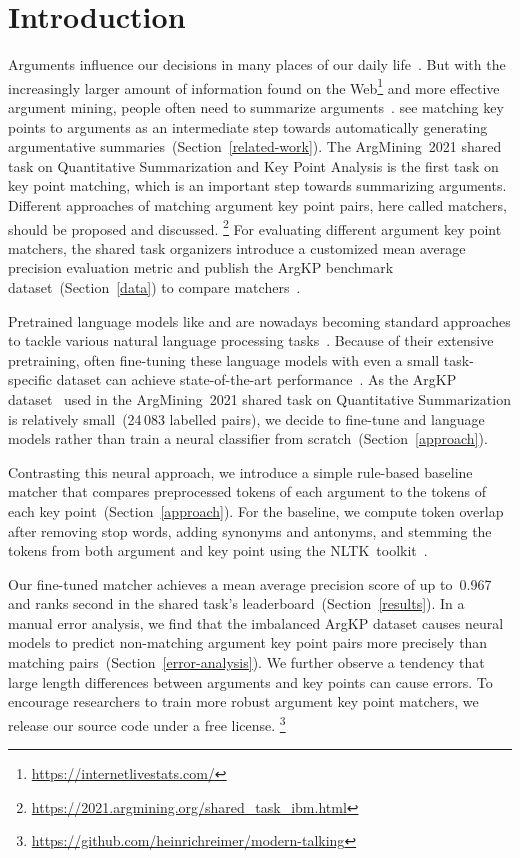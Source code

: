 \section{Introduction}\label{introduction}

Arguments influence our decisions in many places of our daily life~\cite{Bar-HaimEFKLS2020}.
But with the increasingly larger amount of information found on the Web\footnote{\url{https://internetlivestats.com/}} and more effective argument mining, people often need to summarize arguments~\cite{LawrenceR2019,Bar-HaimEFKLS2020}.
\citet{Bar-HaimEFKLS2020} see matching key points to arguments as an intermediate step towards automatically generating argumentative summaries~(Section~\ref{related-work}).
The ArgMining~2021 shared task on Quantitative Summarization and Key Point Analysis is the first task on key point matching, which is an important step towards summarizing arguments.
Different approaches of matching argument key point pairs, here called matchers, should be proposed and discussed.%
\footnote{\url{https://2021.argmining.org/shared_task_ibm.html}}
For evaluating different argument key point matchers, the shared task organizers introduce a customized mean average precision evaluation metric and publish the ArgKP benchmark dataset~(Section~\ref{data}) to compare matchers~\cite{Bar-HaimEFKLS2020}. %

Pretrained language models like \Bert and \Roberta are nowadays becoming standard approaches to tackle various natural language processing tasks~\cite{DevlinCLT2019,LiuOGDJCLLZS2019}.
Because of their extensive pretraining, often fine-tuning these language models with even a small task-specific dataset can achieve state-of-the-art performance~\cite{DevlinCLT2019}.
As the ArgKP dataset~\cite{Bar-HaimEFKLS2020} used in the ArgMining~2021 shared task on Quantitative Summarization is relatively small~(24\,083 labelled pairs), we decide to fine-tune \Bert and \Roberta language models rather than train a neural classifier from scratch~(Section~\ref{approach}).

Contrasting this neural approach, we introduce a simple rule-based baseline matcher that compares preprocessed tokens of each argument to the tokens of each key point~(Section~\ref{approach}).
For the baseline, we compute token overlap after removing stop words, adding synonyms and antonyms, and stemming the tokens from both argument and key point using the NLTK~toolkit~\cite{BirdL2004}.

Our fine-tuned \RobertaBase matcher achieves a mean average precision score of up to~0.967 and ranks second in the shared task's leaderboard~(Section~\ref{results}).
In a manual error analysis, we find that the imbalanced ArgKP dataset causes neural models to predict non-matching argument key point pairs more precisely than matching pairs~(Section~\ref{error-analysis}).
We further observe a tendency that large length differences between arguments and key points can cause errors.
To encourage researchers to train more robust argument key point matchers, we release our source code under a free license.%
\footnote{\url{https://github.com/heinrichreimer/modern-talking}}